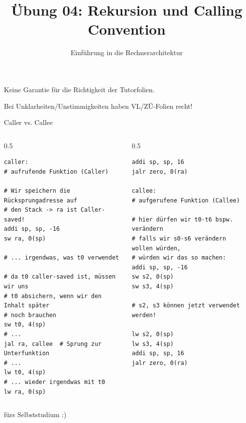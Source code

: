 

\title{Übung 04: Rekursion und Calling Convention}
\subtitle{Einführung in die Rechnerarchitektur}
\date{}



\maketitle

\begin{frame}[c, fragile]{}{}
	\begin{center}
		\LARGE  Keine Garantie für die Richtigkeit der Tutorfolien.

		\Large Bei Unklarheiten/Unstimmigkeiten haben VL/ZÜ-Folien recht!
	\end{center}
\end{frame}

\begin{frame}[c, fragile]{Caller vs. Callee}{}
	\begin{columns}[c]
		\begin{column}{0.5\textwidth}
			\begin{verbatim}
caller:
# aufrufende Funktion (Caller)

# Wir speichern die Rücksprungadresse auf
# den Stack -> ra ist Caller-saved!
addi sp, sp, -16
sw ra, 0(sp)

# ... irgendwas, was t0 verwendet

# da t0 caller-saved ist, müssen wir uns
# t0 absichern, wenn wir den Inhalt später
# noch brauchen
sw t0, 4(sp)
# ...
jal ra, callee  # Sprung zur Unterfunktion
# ...
lw t0, 4(sp)
# ... wieder irgendwas mit t0
lw ra, 0(sp)
        \end{verbatim}
		\end{column}
		\begin{column}{0.5\textwidth}
			\begin{verbatim}
addi sp, sp, 16
jalr zero, 0(ra)

callee:
# aufgerufene Funktion (Callee)

# hier dürfen wir t0-t6 bspw. verändern
# falls wir s0-s6 verändern wollen würden,
# würden wir das so machen:
addi sp, sp, -16
sw s2, 0(sp)
sw s3, 4(sp)

# s2, s3 können jetzt verwendet werden!

lw s2, 0(sp)
lw s3, 4(sp)
addi sp, sp, 16
jalr zero, 0(ra)
      \end{verbatim}
		\end{column}
	\end{columns}
	\begin{center}
		\small{fürs Selbststudium :)}
	\end{center}
\end{frame}

